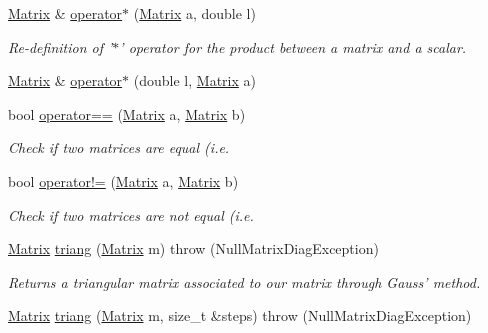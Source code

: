 \begin{CompactItemize}
\hyperlink{classgrassmann_1_1Matrix}{Matrix} \& \hyperlink{classgrassmann_1_1Matrix_91ab0c09218b5b306a7ae46dd1ae6b71}{operator$\ast$} (\hyperlink{classgrassmann_1_1Matrix}{Matrix} a, double l)
\begin{CompactList}\small\item\em Re-definition of '$\ast$' operator for the product between a matrix and a scalar. \item\end{CompactList}\item 
\hyperlink{classgrassmann_1_1Matrix}{Matrix} \& \hyperlink{classgrassmann_1_1Matrix_dfe35f7b86d2a6a1ea631d20038b88c9}{operator$\ast$} (double l, \hyperlink{classgrassmann_1_1Matrix}{Matrix} a)
\item 
bool \hyperlink{classgrassmann_1_1Matrix_f90a77a60d74b87ece26c07d2dc544ef}{operator==} (\hyperlink{classgrassmann_1_1Matrix}{Matrix} a, \hyperlink{classgrassmann_1_1Matrix}{Matrix} b)
\begin{CompactList}\small\item\em Check if two matrices are equal (i.e. \item\end{CompactList}\item 
bool \hyperlink{classgrassmann_1_1Matrix_8cbc99e34ef59ed0adefd4f425705724}{operator!=} (\hyperlink{classgrassmann_1_1Matrix}{Matrix} a, \hyperlink{classgrassmann_1_1Matrix}{Matrix} b)
\begin{CompactList}\small\item\em Check if two matrices are not equal (i.e. \item\end{CompactList}\item 
\hyperlink{classgrassmann_1_1Matrix}{Matrix} \hyperlink{classgrassmann_1_1Matrix_38aaf4ec8160006c88070b706925492d}{triang} (\hyperlink{classgrassmann_1_1Matrix}{Matrix} m)  throw (NullMatrixDiagException)
\begin{CompactList}\small\item\em Returns a triangular matrix associated to our matrix through Gauss' method. \item\end{CompactList}\item 
\hyperlink{classgrassmann_1_1Matrix}{Matrix} \hyperlink{classgrassmann_1_1Matrix_f911ce47206805cf2da81b2f3ea1982b}{triang} (\hyperlink{classgrassmann_1_1Matrix}{Matrix} m, size\_\-t \&steps)  throw (NullMatrixDiagException)
\end{CompactItemize}


